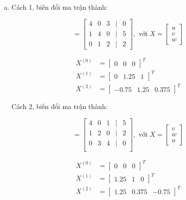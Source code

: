 \documentclass[12pt]{article}
\begin{document}
\begin{enumerate}[a)]
\item Cách 1, biến đổi ma trận thành:

\begin{equation}
 [A|B]=\begin{bmatrix}  4 & 0 & 3 & | & 0\\ 1 & 4 & 0 & | & 5\\ 0 & 1 & 2 & | & 2 \end{bmatrix}, \textrm{~với~} X=\begin{bmatrix}  u\\v\\w \end{bmatrix}
\end{equation}

\begin{align*}
X^{(0)} &= \begin{bmatrix} 
0 & 0 & 0 
\end{bmatrix}^T\\
X^{(1)} &= \begin{bmatrix}
0 & 1.25 & 1
\end{bmatrix}^T\\
X^{(2)} &= \begin{bmatrix}
-0.75 & 1.25 & 0.375
\end{bmatrix}^T
\end{align*}

Cách 2, biến đổi ma trận thành:

\begin{equation}
 [A|B]=\begin{bmatrix} 4 & 0 & 1 & | & 5\\ 1 & 2 & 0 & | & 2\\ 0 & 3 & 4 & | & 0\\ \end{bmatrix}, \textrm{~với~} X=\begin{bmatrix} v\\w\\u \end{bmatrix}
\end{equation}

\begin{align*}
X^{(0)} &= \begin{bmatrix} 
0 & 0 & 0 
\end{bmatrix}^T\\
X^{(1)} &= \begin{bmatrix}
1.25 & 1 & 0
\end{bmatrix}^T\\
X^{(2)} &= \begin{bmatrix}
1.25 & 0.375 & -0.75
\end{bmatrix}^T
\end{align*}

\end{enumerate}
\end{document}
